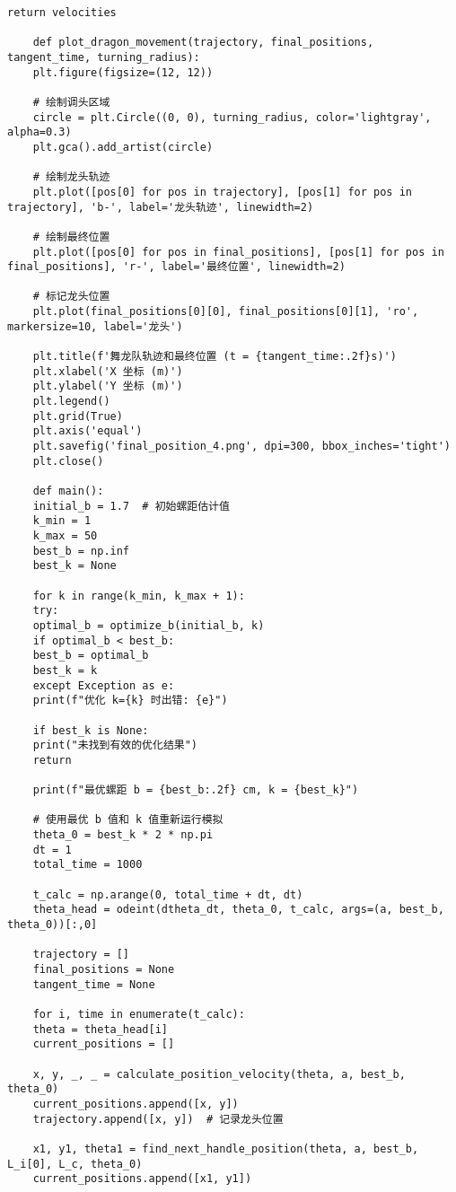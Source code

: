 \begin{lstlisting}[caption={问题四处理代码}]
	return velocities
	
	def plot_dragon_movement(trajectory, final_positions, tangent_time, turning_radius):
	plt.figure(figsize=(12, 12))
	
	# 绘制调头区域
	circle = plt.Circle((0, 0), turning_radius, color='lightgray', alpha=0.3)
	plt.gca().add_artist(circle)
	
	# 绘制龙头轨迹
	plt.plot([pos[0] for pos in trajectory], [pos[1] for pos in trajectory], 'b-', label='龙头轨迹', linewidth=2)
	
	# 绘制最终位置
	plt.plot([pos[0] for pos in final_positions], [pos[1] for pos in final_positions], 'r-', label='最终位置', linewidth=2)
	
	# 标记龙头位置
	plt.plot(final_positions[0][0], final_positions[0][1], 'ro', markersize=10, label='龙头')
	
	plt.title(f'舞龙队轨迹和最终位置 (t = {tangent_time:.2f}s)')
	plt.xlabel('X 坐标 (m)')
	plt.ylabel('Y 坐标 (m)')
	plt.legend()
	plt.grid(True)
	plt.axis('equal')
	plt.savefig('final_position_4.png', dpi=300, bbox_inches='tight')
	plt.close()
	
	def main():
	initial_b = 1.7  # 初始螺距估计值
	k_min = 1
	k_max = 50
	best_b = np.inf
	best_k = None
	
	for k in range(k_min, k_max + 1):
	try:
	optimal_b = optimize_b(initial_b, k)
	if optimal_b < best_b:
	best_b = optimal_b
	best_k = k
	except Exception as e:
	print(f"优化 k={k} 时出错: {e}")
	
	if best_k is None:
	print("未找到有效的优化结果")
	return
	
	print(f"最优螺距 b = {best_b:.2f} cm, k = {best_k}")
	
	# 使用最优 b 值和 k 值重新运行模拟
	theta_0 = best_k * 2 * np.pi
	dt = 1
	total_time = 1000
	
	t_calc = np.arange(0, total_time + dt, dt)
	theta_head = odeint(dtheta_dt, theta_0, t_calc, args=(a, best_b, theta_0))[:,0]
	
	trajectory = []
	final_positions = None
	tangent_time = None
	
	for i, time in enumerate(t_calc):
	theta = theta_head[i]
	current_positions = []
	
	x, y, _, _ = calculate_position_velocity(theta, a, best_b, theta_0)
	current_positions.append([x, y])
	trajectory.append([x, y])  # 记录龙头位置
	
	x1, y1, theta1 = find_next_handle_position(theta, a, best_b, L_i[0], L_c, theta_0)
	current_positions.append([x1, y1])
	

\end{lstlisting}
